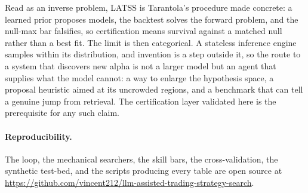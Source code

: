 \documentclass[11pt]{article}
\begin{document}
Read as an inverse problem, LATSS is Tarantola's procedure made concrete: a learned prior proposes
models, the backtest solves the forward problem, and the null-max bar falsifies, so certification means
survival against a matched null rather than a best fit. The limit is then categorical. A stateless
inference engine samples within its distribution, and invention is a step outside it, so the route to a
system that discovers new alpha is not a larger model but an agent that supplies what the model cannot:
a way to enlarge the hypothesis space, a proposal heuristic aimed at its uncrowded regions, and a
benchmark that can tell a genuine jump from retrieval. The certification layer validated here is the
prerequisite for any such claim.

\paragraph{Reproducibility.} The loop, the mechanical searchers, the skill bars, the
cross-validation, the synthetic test-bed, and the scripts producing every table are open source at
\url{https://github.com/vincent212/llm-assisted-trading-strategy-search}.
\end{document}
